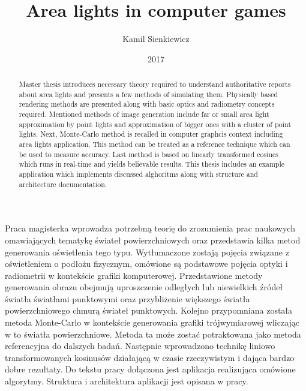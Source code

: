\documentclass[pl]{minipw/minipw}
\title{Area lights in computer games}
\author{Kamil Sienkiewicz}
\date{2017}
\begin{document}
\sloppy
\setcounter{page}{1}

\begin{streszczenie}
Praca magisterka wprowadza potrzebną teorię do zrozumienia prac naukowych omawiających tematykę świateł powierzchniowych oraz przedstawia kilka metod generowania oświetlenia tego typu. Wytłumaczone zostają pojęcia związane z oświetleniem o podłożu fizycznym, omówione są podstawowe pojęcia optyki i radiometrii w kontekście grafiki komputerowej. Przedstawione metody generowania obrazu obejmują uproszczenie odległych lub niewielkich źródeł światła światłami punktowymi oraz przybliżenie większego światła powierzchniowego chmurą świateł punktowych. Kolejno przypomniana została metoda Monte-Carlo w kontekście generowania grafiki trójwymiarowej wliczając w to światła powierzchniowe. Metoda ta może zostać potraktowana jako metoda referencyjna do dalszych badań. Następnie wprowadzono technikę liniowo transformowanych kosinusów działającą w czasie rzeczywistym i dająca bardzo dobre rezultaty. Do tekstu pracy dołączona jest aplikacja realizująca omówione algorytmy. Struktura i architektura aplikacji jest opisana w pracy.
\end{streszczenie}

\begin{abstract}
Master thesis introduces necessary theory required to understand authoritative reports about area lights and presents a few methods of simulating them. Physically based rendering methods are presented along with basic optics and radiometry concepts required. Mentioned methods of image generation include far or small area light approximation by point lights and approximation of bigger ones with a cluster of point lights. Next, Monte-Carlo method is recalled in computer graphcis context including area lights application. This method can be treated as a reference technique which can be used to measure accuracy. Last method is based on linearly transformed cosines which runs in real-time and yields believable results. This thesis includes an example application which implements discussed alghoritms along with structure and architecture documentation.
\end{abstract}

\makestatement

\cleardoublepage
\tableofcontents


\cleardoublepage
\pagestyle{fancy}










\cleardoublepage
\begin{appendices}

\end{appendices}

\printbibliography
\end{document}
